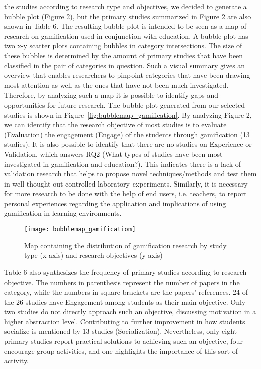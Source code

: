 the studies according to research type and objectives, we decided
to generate a bubble plot (Figure 2), but the primary studies
summarized in Figure 2 are also shown in Table 6. The resulting
bubble plot is intended to be seen as a map of research on
gamification used in conjunction with education. A bubble plot has
two x-y scatter plots containing bubbles in category intersections.
The size of these bubbles is determined by the amount of primary
studies that have been classified in the pair of categories in
question.
Such a visual summary gives an overview that enables researchers
to pinpoint categories that have been drawing most attention as well
as the ones that have not been much investigated. Therefore, by
analyzing such a map it is possible to identify gaps and
opportunities for future research. The bubble plot generated from
our selected studies is shown in Figure~\ref{fig:bubblemap_gamification}.
By analyzing Figure 2, we can identify that the research objective
of most studies is to evaluate (Evaluation) the engagement
(Engage) of the students through gamification (13 studies). It is also
possible to identify that there are no studies on Experience or
Validation, which answers RQ2 (What types of studies have been
most investigated in gamification and education?). This indicates
there is a lack of validation research that helps to propose novel
techniques/methods and test them in well-thought-out controlled
laboratory experiments. Similarly, it is necessary for more research
to be done with the help of end users, i.e. teachers, to report
personal experiences regarding the application and implications of
using gamification in learning environments. 

\begin{figure}[h!]
\caption{Map containing the distribution of gamification research by study type (x axis) and research objectives (y axis) }
\centering
\texttt{[image: bubblemap\_gamification]}
\end{figure}

Table 6 also synthesizes the frequency of primary studies according
to research objective. The numbers in parenthesis represent the
number of papers in the category, while the numbers in square
brackets are the papers’ references. 24 of the 26 studies have
Engagement among students as their main objective. Only two
studies do not directly approach such an objective, discussing
motivation in a higher abstraction level. Contributing to further
improvement in how students socialize is mentioned by 13 studies
(Socialization). Nevertheless, only eight primary studies report
practical solutions to achieving such an objective, four encourage group activities, and one highlights the importance of this sort of
activity.

